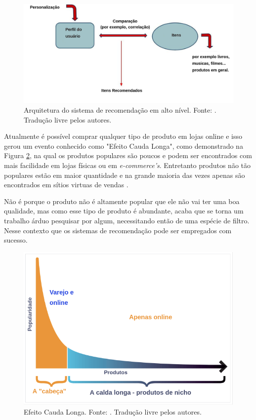 \begin{figure}[H]
    \centering
    \includegraphics[scale=0.35]{figuras/referencial_teorico/sr_arquitetura.png}
    \caption[Arquitetura do sistema de recomendação em alto nível]{Arquitetura do sistema de recomendação em alto nível. Fonte: \cite{Stefanos:2008}. Tradução livre pelos autores.}
    \label{fig:sr_arquitetura}
\end{figure}

Atualmente é possível comprar qualquer tipo de produto em lojas online e isso gerou um evento conhecido como "Efeito Cauda Longa", como demonstrado na Figura \ref{fig:efeito_cauda}, na qual os produtos populares são poucos e podem ser encontrados com mais facilidade em lojas físicas ou em \textit{e-commerce’s}. Entretanto produtos não tão populares estão em maior quantidade e na grande maioria das vezes apenas são encontrados em sítios virtuas de vendas \cite{pandey:2019}.

Não é porque o produto não é altamente popular que ele não vai ter uma boa qualidade, mas como esse tipo de produto é abundante, acaba que se torna um trabalho árduo pesquisar por algum, necessitando então de uma espécie de filtro. Nesse contexto que os sistemas de recomendação pode ser empregados com sucesso.

\begin{figure}[H]
    \centering
    \includegraphics[scale=0.35]{figuras/referencial_teorico/efeito_cauda.png}
    \caption[Efeito Cauda Longa]{Efeito Cauda Longa. Fonte: \cite{pandey:2019}. Tradução livre pelos autores.}
    \label{fig:efeito_cauda}
\end{figure}

